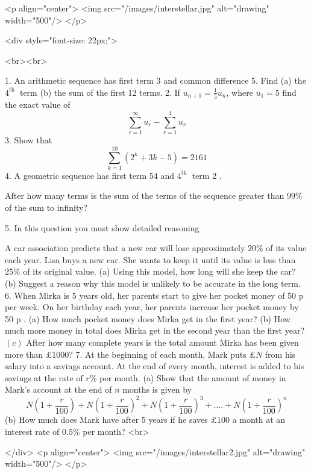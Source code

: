<p align="center">
<img src="/images/interstellar.jpg" alt="drawing" width="500"/>
</p>

<div style="font-size: 22px;">

<br><br>

1. An arithmetic sequence has first term 3 and common difference 5. Find
(a) the $4^{\text {th }}$ term
(b) the sum of the first 12 terms.
2. If $u_{n+1}=\frac{1}{5} u_{n}$, where $u_{1}=5$
find the exact value of
$$
\begin{equation*}
\sum_{r=1}^{\infty} u_{r}-\sum_{r=1}^{4} u_{r} \tag{6}
\end{equation*}
$$
3. Show that
$$
\begin{equation*}
\sum_{k=1}^{10}\left(2^{k}+3 k-5\right)=2161 \tag{4}
\end{equation*}
$$
4. A geometric sequence has first term 54 and $4^{\text {th }}$ term 2 .

After how many terms is the sum of the terms of the sequence greater than $99 \%$ of the sum to infinity?

5. In this question you must show detailed reasoning

A car association predicts that a new car will lose approximately $20 \%$ of its value each year. Lisa buys a new car. She wants to keep it until its value is less than $25 \%$ of its original value.
(a) Using this model, how long will she keep the car?
(b) Suggest a reason why this model is unlikely to be accurate in the long term.
6. When Mirka is 5 years old, her parents start to give her pocket money of 50 p per week. On her birthday each year, her parents increase her pocket money by 50 p .
(a) How much pocket money does Mirka get in the first year?
(b) How much more money in total does Mirka get in the second year than the first year?
\((c)\) After how many complete years is the total amount Mirka has been given more than £1000?
7. At the beginning of each month, Mark puts $£ N$ from his salary into a savings account. At the end of every month, interest is added to his savings at the rate of $r \%$ per month.
(a) Show that the amount of money in Mark's account at the end of $n$ months is given by
$$
\begin{equation*}
N\left(1+\frac{r}{100}\right)+N\left(1+\frac{r}{100}\right)^{2}+N\left(1+\frac{r}{100}\right)^{3}+\ldots .+N\left(1+\frac{r}{100}\right)^{n} \tag{6}
\end{equation*}
$$
(b) How much does Mark have after 5 years if he saves $£ 100$ a month at an interest rate of $0.5 \%$ per month?
<br>

</div>
<p align="center">
<img src="/images/interstellar2.jpg" alt="drawing" width="500"/>
</p>
